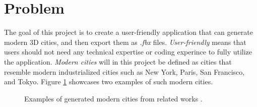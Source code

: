 \newpage
\section{Problem}

The goal of this project is to create a user-friendly application that can generate modern 3D cities, and then export them as \textit{.fbx} files.
\textit{User-friendly} means that users should not need any technical expertise or coding experince to fully utilize the application.
\textit{Modern cities} will in this project be defined as cities that resemble
modern industrialized cities such as New York, Paris, San Francisco, and Tokyo.
Figure \ref{fig:ModernCities} showcases two examples of such modern cities.

\begin{figure}[h!]
  \centering

  \begin{subfigure}[b]{0.48\textwidth}
  \end{subfigure}
  \quad
  \begin{subfigure}[b]{0.48\textwidth}
  \end{subfigure}

  \caption{Examples of generated modern cities from related works \cite{yoav_and_pascal}\cite{cl3ver}.}
  \label{fig:ModernCities}
\end{figure}

